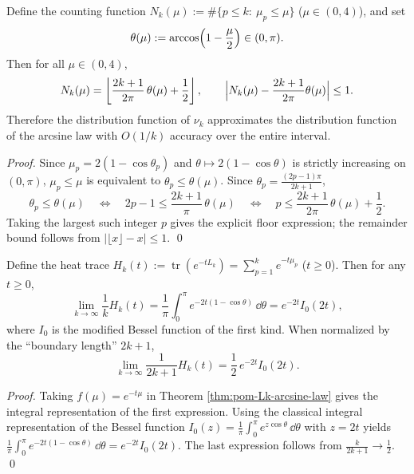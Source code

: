 \begin{corollary}\label{cor:pom-Lk-discrete-weyl}
Define the counting function \(N_k(\mu):=\#\{p\le k:\ \mu_p\le \mu\}\) (\(\mu\in(0,4)\)), and set
\[
\theta(\mu):=\arccos\Bigl(1-\frac{\mu}{2}\Bigr)\in(0,\pi).
\]
Then for all \(\mu\in(0,4)\),
\[
N_k(\mu)=\left\lfloor \frac{2k+1}{2\pi}\,\theta(\mu)+\frac12\right\rfloor,
\qquad
\Bigl|N_k(\mu)-\frac{2k+1}{2\pi}\theta(\mu)\Bigr|\le 1.
\]
Therefore the distribution function of \(\nu_k\) approximates the distribution function of the arcsine law with \(O(1/k)\) accuracy over the entire interval.
\end{corollary}
\begin{proof}
Since \(\mu_p=2(1-\cos\theta_p)\) and \(\theta\mapsto 2(1-\cos\theta)\) is strictly increasing on \((0,\pi)\),
\(\mu_p\le\mu\) is equivalent to \(\theta_p\le \theta(\mu)\).
Since \(\theta_p=\frac{(2p-1)\pi}{2k+1}\),
\[
\theta_p\le\theta(\mu)
\quad\Longleftrightarrow\quad
2p-1\le \frac{2k+1}{\pi}\,\theta(\mu)
\quad\Longleftrightarrow\quad
p\le \frac{2k+1}{2\pi}\,\theta(\mu)+\frac12.
\]
Taking the largest such integer \(p\) gives the explicit floor expression; the remainder bound follows from \(|\lfloor x\rfloor-x|\le 1\). \qed
\end{proof}

\begin{corollary}\label{cor:pom-Lk-heat-kernel-bessel}
Define the heat trace
\(
H_k(t):=\operatorname{tr}(e^{-tL_k})=\sum_{p=1}^{k}e^{-t\mu_p}
\) (\(t\ge 0\)).
Then for any \(t\ge 0\),
\[
\lim_{k\to\infty}\frac{1}{k}H_k(t)
=\frac{1}{\pi}\int_0^\pi e^{-2t(1-\cos\theta)}\,\dd\theta
=e^{-2t}I_0(2t),
\]
where \(I_0\) is the modified Bessel function of the first kind.
When normalized by the ``boundary length'' \(2k+1\),
\[
\lim_{k\to\infty}\frac{1}{2k+1}H_k(t)=\frac12\,e^{-2t}I_0(2t).
\]
\end{corollary}
\begin{proof}
Taking \(f(\mu)=e^{-t\mu}\) in Theorem \ref{thm:pom-Lk-arcsine-law} gives the integral representation of the first expression.
Using the classical integral representation of the Bessel function
\(
I_0(z)=\frac1\pi\int_0^\pi e^{z\cos\theta}\,\dd\theta
\)
with \(z=2t\) yields
\(
\frac{1}{\pi}\int_0^\pi e^{-2t(1-\cos\theta)}\,\dd\theta=e^{-2t}I_0(2t)
\).
The last expression follows from \(\frac{k}{2k+1}\to \frac12\). \qed
\end{proof}

